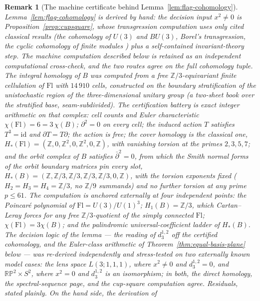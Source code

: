 \documentclass[11pt,a4paper]{article}
\newtheorem{remark}[theorem]{Remark}
\begin{document}
\begin{remark}[The machine certificate behind Lemma~\ref{lem:flag-cohomology}]
\label{rem:machine-certificate}
Lemma~\ref{lem:flag-cohomology} is derived by hand: the decision input
$x^2\ne0$ is Proposition~\ref{prop:cupsquare}, whose transgression
computation uses only cited classical results (the cohomology of
$U(3)$ and $BU(3)$, Borel's transgression, the cyclic cohomology of finite
modules \cite{MilnorStasheff1974,HatcherSS,Brown1982}) plus a self-contained
invariant-theory step. The machine computation described below is retained
as an independent computational cross-check, and the two routes agree on the
full cohomology tuple. The integral homology of $B$ was computed from a free
$\mathbb Z/3$-equivariant finite cellulation of $\mathrm{Fl}$ with
$14\,910$ cells, constructed on the boundary stratification of the
unistochastic region of the three-dimensional unitary group (a two-sheet book
over the stratified base, seam-subdivided). The certification battery is
exact integer arithmetic on that complex: cell counts and Euler
characteristic $\chi(\mathrm{Fl})=6=3\,\chi(B)$; $\partial^2=0$ on every
cell; the induced action $T$ satisfies $T^3=\mathrm{id}$ and
$\partial T=T\partial$; the action is free; the cover homology is the
classical one, $H_*(\mathrm{Fl})=(\mathbb Z,0,\mathbb Z^2,0,\mathbb Z^2,0,
\mathbb Z)$, with vanishing torsion at the primes $2,3,5,7$; and the orbit
complex of $B$ satisfies $\bar\partial^2=0$, from which the Smith normal
forms of the orbit boundary matrices pin every slot,
$H_*(B)=(\mathbb Z,\mathbb Z/3,\mathbb Z/3,\mathbb Z/3,\mathbb Z/3,0,\mathbb
Z)$, with the torsion exponents fixed ($H_2=H_3=H_4=\mathbb Z/3$, no
$\mathbb Z/9$ summands) and no further torsion at any prime $p\le61$. The
computation is anchored externally at four independent points: the
Poincar\'e polynomial of $\mathrm{Fl}=U(3)/U(1)^3$; $H_1(B)=\mathbb Z/3$,
which Cartan--Leray forces for any free $\mathbb Z/3$-quotient of the simply
connected $\mathrm{Fl}$; $\chi(\mathrm{Fl})=3\chi(B)$; and the palindromic
universal-coefficient ladder of $H_*(B)$. The decision logic of the lemma
--- the reading of $d_3^{1,2}$ off the certified cohomology, and the
Euler-class arithmetic of Theorem~\ref{thm:equal-basis-plane} below --- was
re-derived independently and stress-tested on two externally known model
cases: the lens space $L(3;1,1,1)$, where $x^2\ne0$ and $d_3^{1,2}=0$, and
$\mathbb{RP}^2\times S^2$, where $x^2=0$ and $d_3^{1,2}$ is an isomorphism;
in both, the direct homology, the spectral-sequence page, and the cup-square
computation agree. Residuals, stated plainly. On the hand side, the derivation of

\end{remark}
\end{document}
